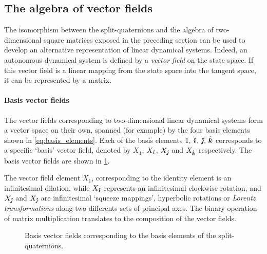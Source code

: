 \subsection{The algebra of vector fields}
\label{ssec:vf_algebra}
The isomorphism between the split-quaternions and the algebra of two-dimensional square matrices exposed in the preceding section can be used to develop an alternative representation of linear dynamical systems. Indeed, an autonomous dynamical system is defined by a \emph{vector field} on the state space. If this vector field is a linear mapping from the state space into the tangent space, it can be represented by a matrix. 

\paragraph{Basis vector fields} The vector fields corresponding to two-dimensional linear dynamical systems form a vector space on their own, spanned (for example) by the four basis elements shown in \cref{eq:basis_elements}. Each of the basis elements $1,\,\quati,\,\quatj,\,\quatk$ corresponds to a specific `basis' vector field, denoted by $X_1$, $X_{\quati}$, $X_{\quatj}$ and $X_{\quatk}$ respectively. The basis vector fields are shown in \cref{fig:basis_vf}. 

The vector field element $X_1$, corresponding to the identity element is an infinitesimal dilation, while $X_{\quati}$ represents an infinitesimal clockwise rotation, and $X_{\quatj}$ and $X_{\quatj}$ are infinitesimal `squeeze mappings', hyperbolic rotations or \emph{Lorentz transformations} along two differents sets of principal axes. The binary operation of matrix multiplication translates to the composition of the vector fields.
\begin{figure}[ht!]
    \centering
    
    \caption{Basis vector fields corresponding to the basis elements of the split-quaternions.}
    \label{fig:basis_vf}
\end{figure}

